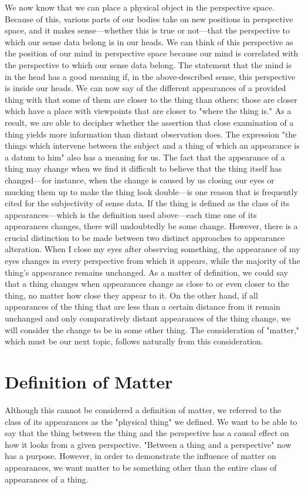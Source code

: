 \documentclass[a4paper,12pt]{book}[2004/02/16]
\theoremstyle{ilemma}
\theoremstyle{itheorem}
\theoremstyle{iother}
\theoremstyle{icorollary}
\theoremstyle{numcorollary}
\theoremstyle{idefinition}
\begin{document}
We now know that we can place a physical object in the perspective space. Because of this, various parts of our bodies take on new positions in perspective space, and it makes sense—whether this is true or not—that the perspective to which our sense data belong is in our heads. We can think of this perspective as the position of our mind in perspective space because our mind is correlated with the perspective to which our sense data belong. The statement that the mind is in the head has a good meaning if, in the above-described sense, this perspective is inside our heads. We can now say of the different
appearances of a provided thing with that some of them are closer to the thing
than others; those are closer which have a place with viewpoints that are
closer to "where the thing is." As a result, we are able to decipher whether the assertion that close examination of a thing yields more information than distant observation does. The expression "the things which intervene between the subject and a thing of which an appearance is a datum to him" also has a meaning for us. The fact that the appearance of a thing may change when we find it difficult to believe that the thing itself has changed—for instance, when the change is caused by us closing our eyes or mucking them up to make the thing look double—is one reason that is frequently cited for the subjectivity of sense data. If the thing is defined as the class of its appearances—which is the definition used above—each time one of its appearances changes, there will undoubtedly be some change. However, there is a crucial distinction to be made between two distinct approaches to appearance alteration. When I close my eyes after observing something, the appearance of my eyes changes in every perspective from which it appears, while the majority of the thing's appearance remains unchanged. As a matter of definition, we could say that a thing changes when appearances change as close to or even closer to the thing, no matter how close they appear to it. On the other hand, if all appearances of the thing that are less than a certain distance from it remain unchanged and only comparatively distant appearances of the thing change, we will consider the change to be in some other thing. The consideration of "matter," which must be our next topic, follows naturally from this consideration.
\section{Definition of Matter}
Although this cannot be considered a definition of matter, we referred to the class of its appearances as the "physical thing" we defined. We want to be able to say that the thing between the thing and the perspective has a causal effect on how it looks from a given perspective. "Between a thing and a perspective" now has a purpose. However, in order to demonstrate the influence of matter on appearances, we want matter to be something other than the entire class of appearances of a thing.
\end{document}
